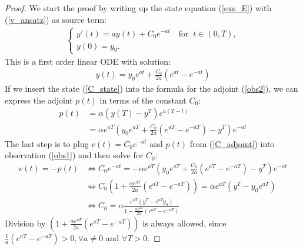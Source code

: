 \begin{proof}
We start the proof by writing up the state equation (\ref{exs_E}) with (\ref{v_ansatz}) as source term:  
\begin{align*}
\left\{
     \begin{array}{lr}
       	y'(t)=ay(t) + C_0 e^{-at}\quad \textrm{for } \ t\in(0,T),\\
       	y(0)=y_0.
     \end{array}
   \right. 
\end{align*}
This is a first order linear ODE with solution:
\begin{align}
y(t) = y_0e^{at} +\frac{C_0}{2a}(e^{at}-e^{-at}) \label{C_state}
\end{align}
If we insert the state (\ref{C_state}) into the formula for the adjoint (\ref{obs2}), we can express the adjoint $p(t)$ in terms of the constant $C_0$:
\begin{align}
p(t) &=  \alpha(y(T)-y^T)e^{a(T-t)} \\
&= \alpha e^{aT}(y_0e^{aT} +\frac{C_0}{2a}(e^{aT}-e^{-aT})-y^T)e^{-at} \label{C_adjoint}
\end{align}
The last step is to plug $v(t) =C_0 e^{-at}$ and $p(t)$ from (\ref{C_adjoint}) into observation (\ref{obs1}) and then solve for $C_0$:
\begin{align*}
v(t)=-p(t) &\iff C_0 e^{-at} = -\alpha e^{aT}(y_0e^{aT} +\frac{C_0}{2a}(e^{aT}-e^{-aT})-y^T)e^{-at}\\
&\iff C_0(1+\frac{\alpha e^{aT}}{2a}(e^{aT}-e^{-aT})) = \alpha e^{aT}(y^T-y_0e^{aT}) \\
&\iff C_0 = \alpha\frac{e^{aT}(y^T-e^{aT}y_0)}{1+\frac{\alpha e^{aT}}{2a}(e^{aT}-e^{-aT})}
\end{align*}
Division by $(1+\frac{\alpha e^{aT}}{2a}(e^{aT}-e^{-aT}))$ is always allowed, since $\frac{1}{a}(e^{aT}-e^{-aT})>0, \forall a\neq0$ and $\forall T>0$. 
\end{proof} 
